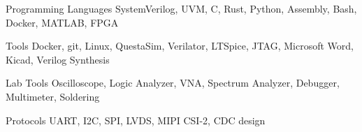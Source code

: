 


\begin{cvskillwrapper}
\begin{cvskills}

  \cvskill
    {Programming Languages} %
    {SystemVerilog, UVM, C, Rust, Python, Assembly, Bash, Docker, MATLAB, FPGA} %

\end{cvskills}


\begin{cvskills}

  \cvskill
    {Tools} %
    {Docker, git, Linux, QuestaSim, Verilator, LTSpice, JTAG, Microsoft Word,
    Kicad, Verilog Synthesis} %

\end{cvskills}

\begin{cvskills}

  \cvskill
    {Lab Tools} %
    {Oscilloscope, Logic Analyzer, VNA, Spectrum Analyzer, Debugger, Multimeter, Soldering} %

\end{cvskills}

\begin{cvskills}

  \cvskill
    {Protocols} %
    {UART, I2C, SPI, LVDS, MIPI CSI-2, CDC design} %

\end{cvskills}

\end{cvskillwrapper}
